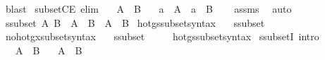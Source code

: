 \begin{isabellebody}
\isamarkupfalse%
\ blast%
\endisatagproof
{\isafoldproof}%
%
\isadelimproof
\isanewline
%
\endisadelimproof
\isanewline
{}\isamarkupfalse%
\ subsetCE\ {\isacharbrackleft}{\kern0pt}elim{\isacharbrackright}{\kern0pt}{\isacharcolon}{\kern0pt}\isanewline
\ \ \ {\isachardoublequoteopen}A\ {\isasymsubseteq}\ B{\isachardoublequoteclose}\isanewline
\ \ \ {\isachardoublequoteopen}a\ {\isasymnotin}\ A{\isachardoublequoteclose}\ {\isacharbar}{\kern0pt}\ {\isachardoublequoteopen}a\ {\isasymin}\ B{\isachardoublequoteclose}\isanewline
%
\isadelimproof
\ \ %
\endisadelimproof
%
\isatagproof
{}\isamarkupfalse%
\ assms\ \isamarkupfalse%
\ auto%
\endisatagproof
{\isafoldproof}%
%
\isadelimproof
%
\endisadelimproof
%
\isadelimdocument
%
\endisadelimdocument
%
\isatagdocument
%
\isamarkuptrue%
%
\endisatagdocument
{\isafolddocument}%
%
\isadelimdocument
%
\endisadelimdocument
{}\isamarkupfalse%
\ {\isachardoublequoteopen}ssubset\ A\ B\ {\isasymequiv}\ A\ {\isasymsubseteq}\ B\ {\isasymand}\ A\ {\isasymnoteq}\ B{\isachardoublequoteclose}\isanewline
\isanewline
{}\isamarkupfalse%
\ hotg{\isacharunderscore}{\kern0pt}ssubset{\isacharunderscore}{\kern0pt}syntax\ \ \isamarkupfalse%
\ ssubset\ {\isacharparenleft}{\kern0pt}\ {\isachardoublequoteopen}{\isasymsubset}{\isachardoublequoteclose}\ {}{}{\isacharparenright}{\kern0pt}\ \isamarkupfalse%
\isanewline
{}\isamarkupfalse%
\ no{\isacharunderscore}{\kern0pt}hotg{\isacharunderscore}{\kern0pt}xsubset{\isacharunderscore}{\kern0pt}syntax\ \ \isamarkupfalse%
\ ssubset\ {\isacharparenleft}{\kern0pt}\ {\isachardoublequoteopen}{\isasymsubset}{\isachardoublequoteclose}\ {}{}{\isacharparenright}{\kern0pt}\ \isamarkupfalse%
\isanewline
{}\isamarkupfalse%
\ hotg{\isacharunderscore}{\kern0pt}ssubset{\isacharunderscore}{\kern0pt}syntax\isanewline
\isanewline
{}\isamarkupfalse%
\ ssubsetI\ {\isacharbrackleft}{\kern0pt}intro{\isacharbrackright}{\kern0pt}{\isacharcolon}{\kern0pt}\isanewline
\ \ \ {\isachardoublequoteopen}A\ {\isasymsubseteq}\ B{\isachardoublequoteclose}\isanewline
\ \ \ {\isachardoublequoteopen}A\ {\isasymnoteq}\ B{\isachardoublequoteclose}\isanewline

\end{isabellebody}
